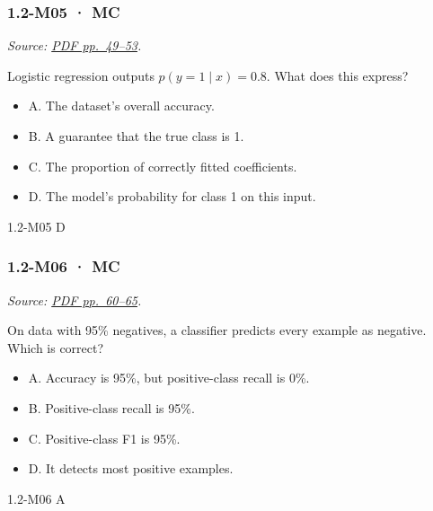 \noindent\begin{minipage}{\linewidth}

\subsubsection{1.2-M05 · MC}\label{m05-mc-1}

\emph{Source:
\href{../Lecture\%20Slides/1.2.\%20Shallow\%20Learning.pdf\#page=49}{PDF
pp.~49--53}.}

Logistic regression outputs \(p(y=1\mid x)=0.8\). What does this
express?

\begin{itemize}
\tightlist
\item
  A. The dataset's overall accuracy.
\item
  B. A guarantee that the true class is 1.
\item
  C. The proportion of correctly fitted coefficients.
\item
  D. The model's probability for class 1 on this input.
\end{itemize}

\begin{solution}[8mm]{1.2-M05}
D
\end{solution}
\end{minipage}\par\medskip

\noindent\begin{minipage}{\linewidth}

\subsubsection{1.2-M06 · MC}\label{m06-mc-1}

\emph{Source:
\href{../Lecture\%20Slides/1.2.\%20Shallow\%20Learning.pdf\#page=60}{PDF
pp.~60--65}.}

On data with 95\% negatives, a classifier predicts every example as
negative. Which is correct?

\begin{itemize}
\tightlist
\item
  A. Accuracy is 95\%, but positive-class recall is 0\%.
\item
  B. Positive-class recall is 95\%.
\item
  C. Positive-class F1 is 95\%.
\item
  D. It detects most positive examples.
\end{itemize}

\begin{solution}[8mm]{1.2-M06}
A
\end{solution}
\end{minipage}\par\medskip

